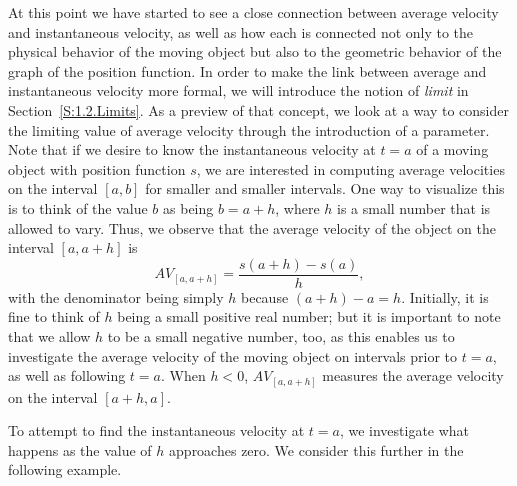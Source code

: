 

At this point we have started to see a close connection between average velocity and instantaneous velocity, as well as how each is connected not only to the physical behavior of the moving object but also to the geometric behavior of the graph of the position function.  In order to make the link between average and instantaneous velocity more formal, we will introduce the notion of \emph{limit} in Section~\ref{S:1.2.Limits}.  As a preview of that concept, we look at a way to consider the limiting value of average velocity through the introduction of a parameter.  Note that if we desire to know the instantaneous velocity at $t = a$ of a moving object with position function $s$, we are interested in computing average velocities on the interval $[a,b]$ for smaller and smaller intervals.  One way to visualize this is to think of the value $b$ as being $b = a + h$, where $h$ is a small number that is allowed to vary.  Thus, we observe that the average velocity of the object on the interval $[a,a+h]$ is
$$AV_{[a,a+h]} = \frac{s(a+h)-s(a)}{h},$$
with the denominator being simply $h$ because $(a+h) - a = h$.  Initially, it is fine to think of $h$ being a small positive real number; but it is important to note that we allow $h$ to be a small negative number, too, as this enables us to investigate the average velocity of the moving object on intervals prior to $t = a$, as well as following $t = a$.  When $h < 0$, $AV_{[a,a+h]}$ measures the average velocity on the interval $[a+h,a]$.  

To attempt to find the instantaneous velocity at $t = a$, we investigate what happens as the value of $h$ approaches zero.  We consider this further in the following example.

